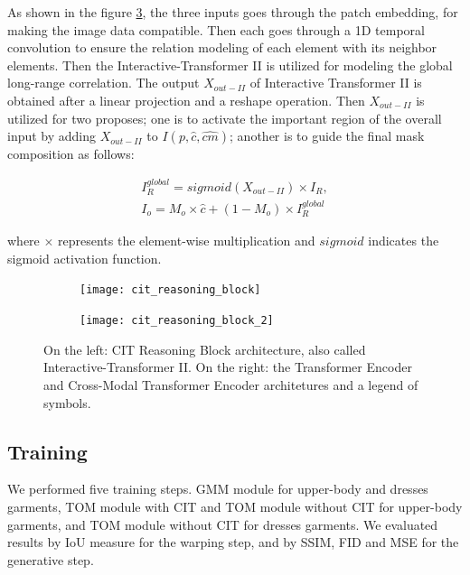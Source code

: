 As shown in the figure \ref{fig:cit_architecture}, the three inputs goes through the patch embedding, for making the image data compatible.  Then each goes through a 1D temporal convolution to ensure the relation modeling of each element with its neighbor elements. Then the Interactive-Transformer II is utilized for modeling the global long-range correlation. The output $X_{out-II}$ of Interactive Transformer II is obtained after a linear projection and a reshape operation. Then $X_{out-II}$ is utilized for two proposes; one is to activate the important region of the overall input by adding $X_{out-II}$ to $I(p,\hat{c},\hat{cm})$; another is to guide the final mask composition as follows:

\begin{equation}
  \begin{aligned}
    I_{R}^{global} = sigmoid(X_{out-II}) \times I_R, \\
I_o = M_o \times \hat{c} + (1 - M_o) \times I_{R}^{global}
  \end{aligned}
\end{equation}

where $\times$ represents the element-wise multiplication and $sigmoid$ indicates the sigmoid activation function.

\FloatBarrier
\begin{figure}[h]
\centering
\begin{subfigure}{0.7\linewidth}
  \centering
  \texttt{[image: cit\_reasoning\_block]}
  \label{fig:sub1}
\end{subfigure}%
\begin{subfigure}{0.3\linewidth}
  \centering
  \texttt{[image: cit\_reasoning\_block\_2]}
  \label{fig:sub2}
\end{subfigure}
\caption{On the left: CIT Reasoning Block architecture, also called Interactive-Transformer II. On the right: the Transformer Encoder and Cross-Modal Transformer Encoder architetures and a legend of symbols.}
\label{fig:cit_architecture}
\end{figure}
\FloatBarrier

\subsection{Training}
We performed five training steps. GMM module for upper-body and dresses garments, TOM module with CIT and TOM module without CIT for upper-body garments, and TOM module without CIT for dresses garments. We evaluated results by IoU measure for the warping step, and by SSIM, FID and MSE for the generative step.

